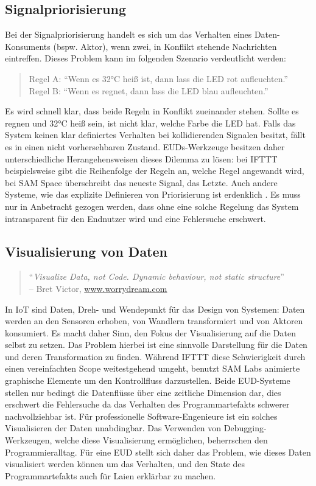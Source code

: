 \subsection{Signalpriorisierung}
Bei der Signalpriorisierung handelt es sich um das Verhalten eines Daten-Konsuments (bspw. Aktor), wenn zwei, in Konflikt stehende Nachrichten eintreffen. Dieses Problem kann im folgenden Szenario verdeutlicht werden:
\begin{quote}
Regel A: "`Wenn es 32°C heiß ist, dann lass die LED rot aufleuchten."' \\
Regel B: "`Wenn es regnet, dann lass die LED blau aufleuchten."'
\end{quote}
Es wird schnell klar, dass beide Regeln in Konflikt zueinander stehen. Sollte es regnen und 32°C heiß sein, ist nicht klar, welche Farbe die LED hat. Falls das System keinen klar definiertes Verhalten bei kollidierenden Signalen besitzt, fällt es in einen nicht vorhersehbaren Zustand. \acp{EUD}-Werkzeuge besitzen daher unterschiedliche Herangehensweisen dieses Dilemma zu lösen: bei IFTTT beispielsweise gibt die Reihenfolge der Regeln an, welche Regel angewandt wird, bei SAM Space überschreibt das neueste Signal, das Letzte. Auch andere Systeme, wie das explizite Definieren von Priorisierung ist erdenklich \cite{MacLaurin2011kodu}. Es muss nur in Anbetracht gezogen werden, dass ohne eine solche Regelung das System intransparent für den Endnutzer wird und eine Fehlersuche erschwert.

\subsection{Visualisierung von Daten}
\begin{quote}
    "`\textit{Visualize Data, not Code. Dynamic behaviour, not static structure}"' \\ -- Bret Victor, \url{www.worrydream.com}
\end{quote}
In \ac{IoT} sind Daten, Dreh- und Wendepunkt für das Design von Systemen: Daten werden an den Sensoren erhoben, von Wandlern transformiert und von Aktoren konsumiert. Es macht daher Sinn, den Fokus der Visualisierung auf die Daten selbst zu setzen. Das Problem hierbei ist eine sinnvolle Darstellung für die Daten und deren Transformation zu finden. Während IFTTT diese Schwierigkeit durch einen vereinfachten Scope weitestgehend umgeht, benutzt SAM Labs animierte graphische Elemente um den Kontrollfluss darzustellen. Beide \ac{EUD}-Systeme stellen nur bedingt die Datenflüsse über eine zeitliche Dimension dar, dies erschwert die Fehlersuche da das Verhalten des Programmartefakts schwerer nachvollziehbar ist. Für professionelle Software-Engenieure ist ein solches Visualisieren der Daten unabdingbar. Das Verwenden von Debugging-Werkzeugen, welche diese Visualisierung ermöglichen, beherrschen den Programmier\-alltag. Für eine \ac{EUD} stellt sich daher das Problem, wie dieses Daten visualisiert werden können um das Verhalten, und den State des Programmartefakts auch für Laien erklärbar zu machen. 


